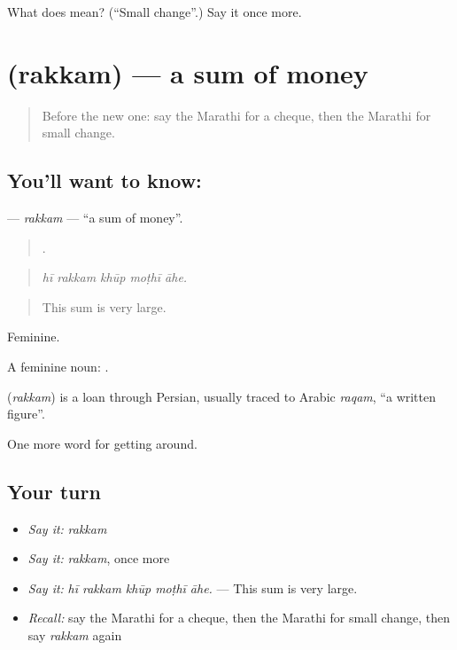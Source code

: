 \begin{tcolorbox}[breakable,colback=teal!4,colframe=teal!35!black,title={Before you move on}]
What does  mean? (\textquotedblleft{}Small change\textquotedblright{}.) Say it once more.
\end{tcolorbox}
\section[\texorpdfstring{\mr{रक्कम} (rakkam)}{रक्कम (rakkam)}]{ (rakkam) — a sum of money}

\label{lesson:MR-C426-rakkam}



\begin{quote}
Before the new one: say the Marathi for a cheque, then the Marathi for small change.
\end{quote}

\subsection*{You'll want to know: }
\textbf{} — \emph{rakkam} — \textquotedblleft{}a sum of money\textquotedblright{}.

\begin{quote}
    .
\end{quote}

\begin{quote}
\emph{hī rakkam khūp moṭhī āhe.}
\end{quote}

\begin{quote}
This sum is very large.
\end{quote}

Feminine.

A feminine noun:  .

\begin{cousinweb}
\textbf{} (\emph{rakkam}) is a loan through Persian, usually traced to Arabic \emph{raqam}, \textquotedblleft{}a written figure\textquotedblright{}.
\end{cousinweb}

\begin{grammarlens}[title={What you've built}]
One more word for getting around.
\end{grammarlens}

\subsection*{Your turn}
\begin{itemize}
\raggedright
  \item \emph{Say it:} \emph{rakkam}
  \item \emph{Say it:} \emph{rakkam}, once more
  \item \emph{Say it:} \emph{hī rakkam khūp moṭhī āhe.} — This sum is very large.
  \item \emph{Recall:} say the Marathi for a cheque, then the Marathi for small change, then say \emph{rakkam} again
\end{itemize}


